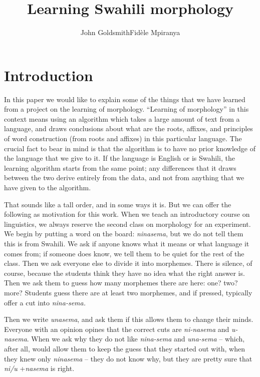 \documentclass[output=paper,colorlinks,citecolor=brown,
]{langscibook}
\author{John Goldsmith\affiliation{University of Chicago}\lastand Fidèle Mpiranya\affiliation{University of Chicago}}
\title{Learning Swahili morphology}
\begin{document}
\maketitle

\section{Introduction}
In this paper we would like to explain some of the things that we have learned from a project on the learning of morphology. ``Learning of morphology'' in this context means using an algorithm which takes a large amount of text from a language, and draws conclusions about what are the roots, affixes, and principles of word construction (from roots and affixes) in this particular language. The crucial fact to bear in mind is that the algorithm is to have no prior knowledge of the language that we give to it. If the language is English or is Swahili, the learning algorithm starts from the same point; any differences that it draws between the two derive entirely from the data, and not from anything that we have given to the algorithm. 

That sounds like a tall order, and in some ways it is. But we can offer the following as motivation for this work. When we teach an introductory course on linguistics, we always reserve the second class on morphology for an experiment. We begin by putting a word on the board: \textit{ninasema}, but we do not tell them this is from Swahili. We ask if anyone knows what it means or what language it comes from; if someone does know, we tell them to be quiet for the rest of the class. Then we ask everyone else to divide it into morphemes. There is silence, of course, because the students think they have no idea what the right answer is. Then we ask them to guess how many morphemes there are here: one? two? more? Students guess there are at least two morphemes, and if pressed, typically offer a cut into \textit{nina-sema.}

Then we write \textit{unasema}, and ask them if this allows them to change their minds. Everyone with an opinion opines that the correct cuts are \textit{ni-nasema} and \textit{u-nasema}. When we ask why they do not like \textit{nina-sema} and \textit{una-sema} -- which, after all, would allow them to keep the guess that they started out with, when they knew only \textit{ninasema} -- they do not know why, but they are pretty sure that \textit{ni/u} +\textit{nasema} is right.
\end{document}
